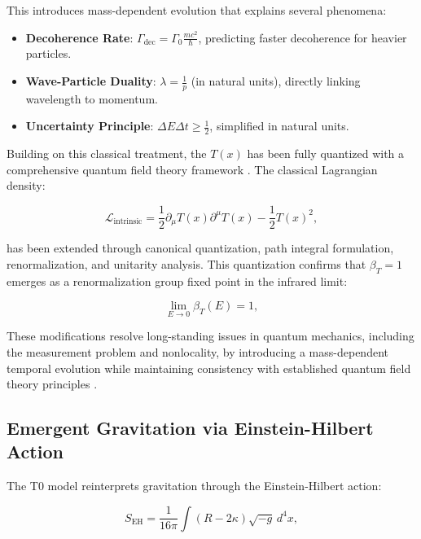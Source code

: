 \documentclass[twocolumn,aps,prl]{revtex4-2}
\begin{document}
	This introduces mass-dependent evolution that explains several phenomena:
	
	\begin{itemize}
		\item \textbf{Decoherence Rate}: $\Gamma_{\text{dec}} = \Gamma_0 \frac{m c^2}{\hbar}$, predicting faster decoherence for heavier particles.
		\item \textbf{Wave-Particle Duality}: $\lambda = \frac{1}{p}$ (in natural units), directly linking wavelength to momentum.
		\item \textbf{Uncertainty Principle}: $\Delta E \Delta t \geq \frac{1}{2}$, simplified in natural units.
	\end{itemize}
	
	Building on this classical treatment, the $T(x)$ has been fully quantized with a comprehensive quantum field theory framework \cite{pascher_qft_2025}. The classical Lagrangian density:
	
	\begin{equation}
		\mathcal{L}_{\text{intrinsic}} = \frac{1}{2} \partial_{\mu} T(x) \partial^{\mu} T(x) - \frac{1}{2} T(x)^2, \label{eq:lagrangian_T}
	\end{equation}
	
	has been extended through canonical quantization, path integral formulation, renormalization, and unitarity analysis. This quantization confirms that $\beta_T = 1$ emerges as a renormalization group fixed point in the infrared limit:
	
	\begin{equation}
		\lim_{E \to 0} \beta_T(E) = 1, \label{eq:beta_fixed_point}
	\end{equation}
	
	These modifications resolve long-standing issues in quantum mechanics, including the measurement problem and nonlocality, by introducing a mass-dependent temporal evolution while maintaining consistency with established quantum field theory principles \cite{pascher_quantum_2025}.
	
	\subsection{Emergent Gravitation via Einstein-Hilbert Action}
	\label{subsec:gravitation}
	
	The T0 model reinterprets gravitation through the Einstein-Hilbert action:
	
	\begin{equation}
		S_{\text{EH}} = \frac{1}{16 \pi} \int (R - 2 \kappa) \sqrt{-g} \, d^4 x, \label{eq:einstein_hilbert}
	\end{equation}
	
\end{document}
